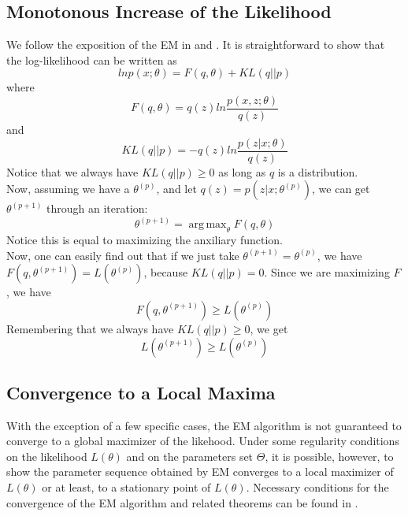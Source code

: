 \documentclass[11pt]{article}
\DeclareMathOperator*{\argmax}{arg\,max}
\begin{document}
\subsection{Monotonous Increase of the Likelihood}
We follow the exposition of the EM in \cite{PRML} and \cite{1998RM}. It is straightforward to show that the log-likelihood can be written as
\begin{equation}
lnp(x;\theta)=F(q,\theta) + KL(q||p)
\end{equation}
where
\begin{equation}
F(q,\theta)=q(z)ln\frac{p(x,z;\theta)}{q(z)}
\end{equation}
and
\begin{equation}
KL(q||p)=-q(z)ln\frac{p(z|x;\theta)}{q(z)}
\end{equation}
Notice that we always have $KL(q||p) \geq 0$ as long as $q$ is a distribution.\\
Now, assuming we have a $\theta^{(p)}$, and let $q(z) = p(z|x;\theta^{(p)})$, we can get $\theta^{(p+1)}$ through an iteration:
\begin{equation}
\theta^{(p+1)} = \argmax_{\theta}F(q, \theta)
\end{equation}
Notice this is equal to maximizing the anxiliary function.\\
Now, one can easily find out that if we just take $\theta^{(p+1)}=\theta^{(p)}$, we have$F(q, \theta^{(p+1)}) = L(\theta^{(p)})$, because $KL(q||p)=0$. Since we are maximizing $F$, we have
\begin{equation}
F(q, \theta^{(p+1)}) \geq L(\theta^{(p)})
\end{equation}
Remembering that we always have $KL(q||p) \geq 0$, we get
\begin{equation}
L(\theta^{(p+1)}) \geq L(\theta^{(p)})
\end{equation}
\subsection{Convergence to a Local Maxima}
With the exception of a few specific cases, the EM algorithm is not guaranteed to converge to a global maximizer of the likehood\cite{EMTour}. Under some regularity conditions on the likelihood $L(\theta)$ and on the parameters set $\Theta$, it is possible, however, to show the parameter sequence obtained by EM converges to a local maximizer of $L(\theta)$ or at least, to a stationary point of $L(\theta)$. Necessary conditions for the convergence of the EM algorithm and related theorems can be found in 
\cite{EMCov}.
\end{document}
